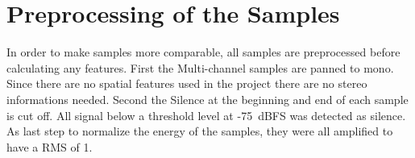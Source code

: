 \section{Preprocessing of the Samples}
\label{sec:Preprocessing}
In order to make samples more comparable, all samples are preprocessed before calculating any features. First the Multi-channel samples are panned to mono. Since there are no spatial features used in the project there are no stereo informations needed. Second the Silence at the beginning and end of each sample is cut off. All signal below a threshold level at -75~dBFS was detected as silence. As last step to normalize the energy of the samples, they were all amplified to have a RMS of 1.